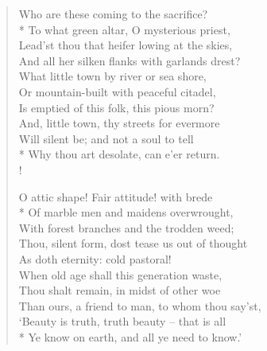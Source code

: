 \begin{verse}
Who are these coming to the sacrifice?\\*
\vin To what green altar, O mysterious priest,\\
Lead'st thou that heifer lowing at the skies,\\
\vin And all her silken flanks with garlands drest?\\
What little town by river or sea shore,\\
\vin Or mountain-built with peaceful citadel,\\
\vin \vin Is emptied of this folk, this pious morn?\\
And, little town, thy streets for evermore\\
\vin Will silent be; and not a soul to tell\\*
\vin \vin Why thou art desolate, can e'er return.\\!

O attic shape! Fair attitude! with brede\\*
\vin Of marble men and maidens overwrought,\\
With forest branches and the trodden weed;\\
\vin Thou, silent form, dost tease us out of thought\\
As doth eternity: cold pastoral!\\
\vin When old age shall this generation waste,\\
\vin \vin Thou shalt remain, in midst of other woe\\
Than ours, a friend to man, to whom thou say'st,\\
\vin `Beauty is truth, truth beauty -- that is all\\*
\vin \vin Ye know on earth, and all ye need to know.'
\end{verse}